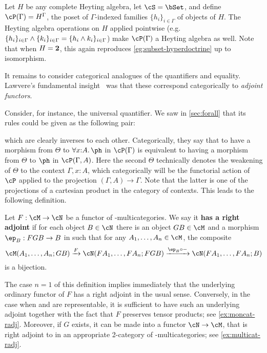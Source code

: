 \begin{eg}\label{eg:family-hyperdoctrine}
  Let $H$ be any complete Heyting algebra, let $\cS=\bSet$, and define $\cP(\Gamma) = H^\Gamma$, the poset of $\Gamma$-indexed families $\{h_i\}_{i\in\Gamma}$ of objects of $H$.
  The Heyting algebra operations on $H$ applied pointwise (e.g. $\{h_i\}_{i\in\Gamma} \wedge \{k_i\}_{i\in\Gamma}= \{h_i\wedge k_i\}_{i\in\Gamma}$) make $\cP(\Gamma)$ a Heyting algebra as well.
  Note that when $H=\mathbf{2}$, this again reproduces \cref{eg:subset-hyperdoctrine} up to isomorphism.
\end{eg}

It remains to consider categorical analogues of the quantifiers and equality.
Lawvere's fundamental insight~\cite{lawvere:adjointness,lawvere:comprehension} was that these correspond categorically to \emph{adjoint functors}.

Consider, for instance, the universal quantifier.
We saw in \cref{sec:forall} that its rules could be given as the following pair:
which are clearly inverses to each other.
Categorically, they say that to have a morphism from $\Theta$ to $\forall x:A.\ph$ in $\cP(\Gamma)$ is equivalent to having a morphism from $\Theta$ to $\ph$ in $\cP(\Gamma,A)$.
Here the second $\Theta$ technically denotes the weakening of $\Theta$ to the context $\Gamma,x:A$, which categorically will be the functorial action of $\cP$ applied to the projection $(\Gamma,A)\to \Gamma$.
Note that the latter is one of the projections of a cartesian product in the category of contexts.
This leads to the following definition.

\begin{defn}\label{defn:multicat-radj}
  Let $F:\cM\to\cN$ be a functor of \fS-multicategories.
  We say it \textbf{has a right adjoint} if for each object $B\in\cN$ there is an object $GB\in\cM$ and a morphism $\ep_B:FGB\to B$ in \cN such that for any $A_1,\dots,A_n\in \cM$, the composite
  \[ \cM(A_1,\dots,A_n;GB) \xto{F} \cN(FA_1,\dots,FA_n;FGB) \xto{\ep_B\circ -} \cN(FA_1,\dots,FA_n;B) \]
  is a bijection.
\end{defn}

The case $n=1$ of this definition implies immediately that the underlying ordinary functor of $F$ has a right adjoint in the usual sense.
Conversely, in the case when \cM and \cN are representable, it is sufficient to have such an underlying adjoint together with the fact that $F$ preserves tensor products; see \cref{ex:moncat-radj}.
Moreover, if $G$ exists, it can be made into a functor $\cN\to\cM$, that is right adjoint to \cM in an appropriate 2-category of \fS-multicategories; see \cref{ex:multicat-radj}.

